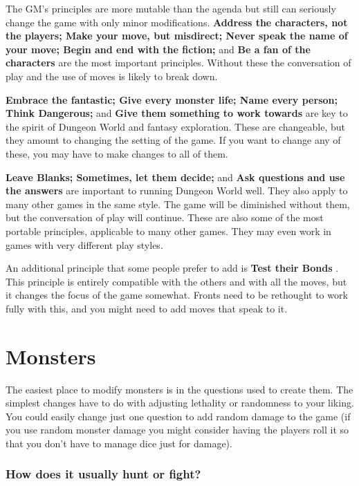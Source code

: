  

The GM's principles are more mutable than the agenda but still can seriously change the game with only minor modifications. {\bf Address the characters, not the players; Make your move, but misdirect; Never speak the name of your move; Begin and end with the fiction;}  and {\bf Be a fan of the characters}  are the most important principles. Without these the conversation of play and the use of moves is likely to break down.

 

{\bf Embrace the fantastic; Give every monster life; Name every person; Think Dangerous;}  and {\bf Give them something to work towards}  are key to the spirit of Dungeon World and fantasy exploration. These are changeable, but they amount to changing the setting of the game. If you want to change any of these, you may have to make changes to all of them.

 

{\bf Leave Blanks; Sometimes, let them decide;}  and {\bf Ask questions and use the answers}  are important to running Dungeon World well. They also apply to many other games in the same style. The game will be diminished without them, but the conversation of play will continue. These are also some of the most portable principles, applicable to many other games. They may even work in games with very different play styles.

 

An additional principle that some people prefer to add is {\bf Test their Bonds} . This principle is entirely compatible with the others and with all the moves, but it changes the focus of the game somewhat. Fronts need to be rethought to work fully with this, and you might need to add moves that speak to it.

 
\section{Monsters}   
 

The easiest place to modify monsters is in the questions used to create them. The simplest changes have to do with adjusting lethality or randomness to your liking. You could easily change just one question to add random damage to the game (if you use random monster damage you might consider having the players roll it so that you don't have to manage dice just for damage).

 
\subsubsection{How does it usually hunt or fight?}    
 
